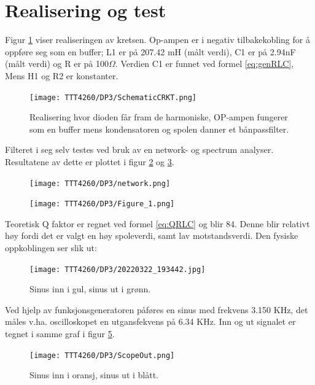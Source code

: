 \documentclass[a4paper,11pt,norsk]{article}
\begin{document}
\section{Realisering og test}
\label{sec:realisering}

Figur \ref{fig:Multiplikator} viser realiseringen av kretsen. Op-ampen er i negativ tilbakekobling for å oppføre seg som en buffer; L1 er på 207.42 mH (målt verdi), C1 er på 2.94nF (målt verdi) og R er på 100${\Omega}$. Verdien C1 er funnet ved formel \ref{eq:genRLC}, Mens H1 og R2 er konstanter.



\begin{figure}[H]
  \centering
  \texttt{[image: TTT4260/DP3/SchematicCRKT.png]} 
  \caption{Realisering hvor dioden får fram de harmoniske, OP-ampen fungerer som en buffer mens kondensatoren og spolen danner et bånpassfilter.}
  \label{fig:Multiplikator}
\end{figure}

Filteret i seg selv testes ved bruk av en network- og spectrum analyser. Resultatene av dette er plottet i figur \ref{fig:netwok} og \ref{fig:bode}.

\begin{figure}[H]
  \centering
  \texttt{[image: TTT4260/DP3/network.png]} 
  \caption{}
  \label{fig:netwok}
\end{figure}

\begin{figure}[H]
  \centering
  \texttt{[image: TTT4260/DP3/Figure\_1.png]} 
  \caption{}
  \label{fig:bode}
\end{figure}

Teoretisk Q faktor er regnet ved formel \ref{eq:QRLC} og blir 84. Denne blir relativt høy fordi det er valgt en høy spoleverdi, samt lav motstandsverdi. Den fysiske oppkoblingen ser slik ut:

\begin{figure}[H]
  \centering
  \texttt{[image: TTT4260/DP3/20220322\_193442.jpg]} 
  \caption{Sinus inn i gul, sinus ut i grønn.}
  \label{fig:Fysisk}
\end{figure}

Ved hjelp av funksjonsgeneratoren påføres en sinus med frekvens 3.150 KHz, det måles v.ha. oscilloskopet en utgansfekvens på 6.34 KHz. Inn og ut signalet er tegnet i samme graf i figur \ref{fig:Skop}.

\begin{figure}[H]
  \centering
  \texttt{[image: TTT4260/DP3/ScopeOut.png]} 
  \caption{Sinus inn i oransj, sinus ut i blått.}
  \label{fig:Skop}
\end{figure}
\end{document}
